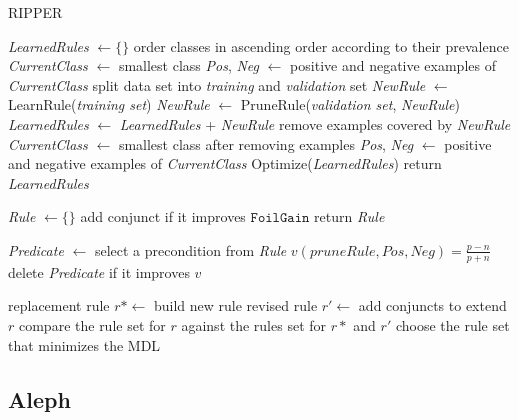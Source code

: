 \begin{algorithm}
	\caption{RIPPER}
	\label{alg:RIPPER}
	\begin{algorithmic}[1]
			\State \textit{LearnedRules} $\gets \{ \}$
			\State order classes in ascending order according to their prevalence
			\State \textit{CurrentClass} $\gets$ smallest class
			\State \textit{Pos}, \textit{Neg} $\gets$ positive and negative examples of \textit{CurrentClass}
				\State split data set into \textit{training} and \textit{validation} set
				\State \textit{NewRule} $\gets$ LearnRule(\textit{training set})
				\State \textit{NewRule} $\gets$ PruneRule(\textit{validation set}, \textit{NewRule})
				\State \textit{LearnedRules} $\gets$ \textit{LearnedRules} + \textit{NewRule}
				\State remove examples covered by \textit{NewRule}
				\State \textit{CurrentClass} $\gets$ smallest class after removing examples
				\State \textit{Pos}, \textit{Neg} $\gets$ positive and negative examples of \textit{CurrentClass}
			\EndWhile
			\State Optimize(\textit{LearnedRules})
			\State return \textit{LearnedRules}
		\EndFunction
		\Statex
		
			\State \textit{Rule} $\gets \{ \}$
				\State add conjunct if it improves $\mathtt{FoilGain}$
			\EndWhile
			\State return \textit{Rule}
		\EndFunction
		\Statex
		
			\Repeat
				\State \textit{Predicate} $\gets$ select a precondition from \textit{Rule}
				\State $v(pruneRule,Pos,Neg) = \frac{p - n}{p + n}$
				\State delete \textit{Predicate} if it improves $v$ 
		\EndFunction
		\Statex
		
				\State replacement rule $r* \gets$ build new rule
				\State revised rule $r' \gets$ add conjuncts to extend $r$
				\State compare the rule set for $r$ against the rules set for $r*$ and $r'$
				\State choose the rule set that minimizes the MDL
			\EndFor
		\EndFunction
	\end{algorithmic}	

\end{algorithm}






\subsection{Aleph}


